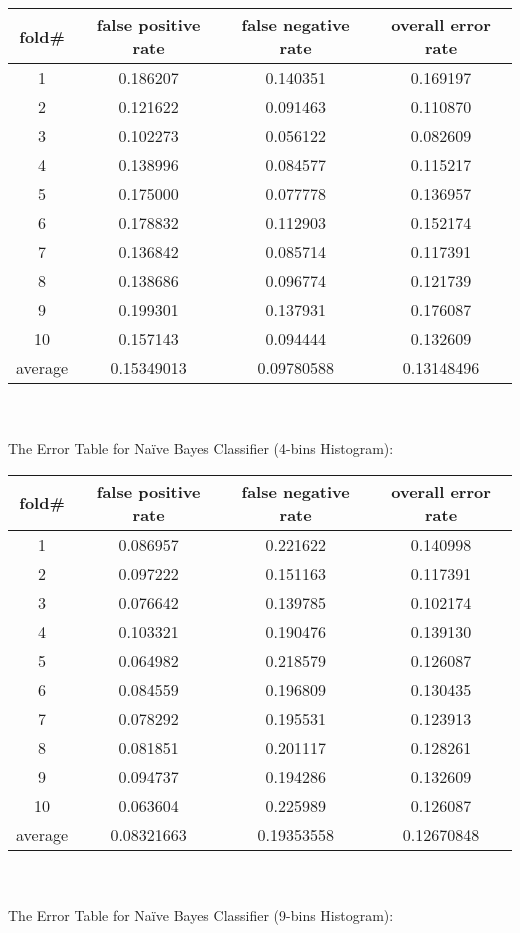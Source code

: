 \documentclass[11pt,a4paper,fleqn]{article}
\begin{document}
\begin{tabular}{|c|c|c|c|}
\hline
fold\#&false positive rate&false negative rate&overall error rate\\
\hline
1&0.186207&0.140351&0.169197\\
\hline
2&0.121622&0.091463&0.110870\\
\hline
3&0.102273&0.056122&0.082609\\
\hline
4&0.138996&0.084577&0.115217\\
\hline
5&0.175000&0.077778&0.136957\\
\hline
6&0.178832&0.112903&0.152174\\
\hline
7&0.136842&0.085714&0.117391\\
\hline
8&0.138686&0.096774&0.121739\\
\hline
9&0.199301&0.137931&0.176087\\
\hline
10&0.157143&0.094444&0.132609\\
\hline
average&0.15349013&0.09780588&0.13148496\\
\hline
\end{tabular}\\
\\
The Error Table for Na\"{i}ve Bayes Classifier (4-bins Histogram):\\
\begin{tabular}{|c|c|c|c|}
\hline
fold\#&false positive rate&false negative rate&overall error rate\\
\hline
1&0.086957&0.221622&0.140998\\
\hline
2&0.097222&0.151163&0.117391\\
\hline
3&0.076642&0.139785&0.102174\\
\hline
4&0.103321&0.190476&0.139130\\
\hline
5&0.064982&0.218579&0.126087\\
\hline
6&0.084559&0.196809&0.130435\\
\hline
7&0.078292&0.195531&0.123913\\
\hline
8&0.081851&0.201117&0.128261\\
\hline
9&0.094737&0.194286&0.132609\\
\hline
10&0.063604&0.225989&0.126087\\
\hline
average&0.08321663&0.19353558&0.12670848\\
\hline
\end{tabular}\\
\\
The Error Table for Na\"{i}ve Bayes Classifier (9-bins Histogram):\\
\end{document}
